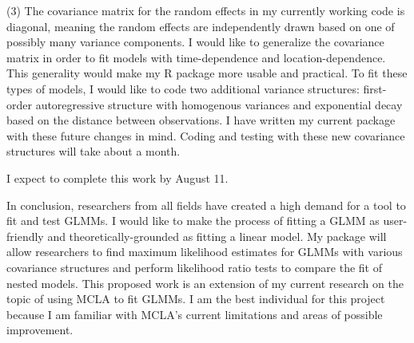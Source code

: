 \documentclass[12pt]{article}
\begin{document}
(3) The covariance matrix for the random effects in my currently working code is diagonal, meaning the random effects are independently drawn based on one of possibly many variance components.  I would like to generalize the covariance matrix in order to fit models with time-dependence and location-dependence.  This generality would make my R package more usable and practical.  To fit these types of models, I would like to code two additional variance structures:  first-order autoregressive structure with homogenous variances and exponential decay based on the distance between observations.  I have written my current package with these future changes in mind. Coding and testing with these new covariance structures will take about a month.

I expect to complete this work by August 11.



In conclusion, researchers from all fields have created a high demand for a tool to fit and test GLMMs. I would like to make the process of fitting a GLMM as user-friendly and theoretically-grounded as fitting a linear model. My package will allow researchers to find maximum likelihood estimates for GLMMs with various covariance structures and perform likelihood ratio tests to compare the fit of nested models.  This proposed work is an extension of my current  research on the topic of using MCLA to fit GLMMs.  I am the best individual for this project because I am familiar with MCLA's current limitations and areas of possible improvement.  

\vspace{-2.3cm}
\renewcommand{\refname}{}


\end{document}

